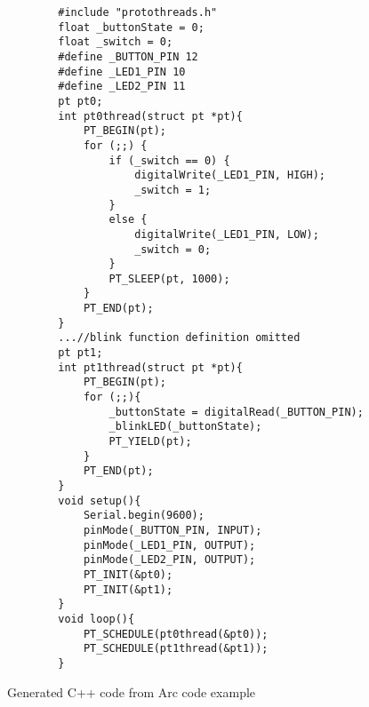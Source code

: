 \begin{listing}[htb!]
    \begin{verbatim}
        #include "protothreads.h"
        float _buttonState = 0;
        float _switch = 0;
        #define _BUTTON_PIN 12
        #define _LED1_PIN 10
        #define _LED2_PIN 11
        pt pt0;
        int pt0thread(struct pt *pt){
            PT_BEGIN(pt);
            for (;;) {
                if (_switch == 0) {
                    digitalWrite(_LED1_PIN, HIGH);
                    _switch = 1;
                }
                else {
                    digitalWrite(_LED1_PIN, LOW);
                    _switch = 0;
                }
                PT_SLEEP(pt, 1000);
            }
            PT_END(pt);
        }
        ...//blink function definition omitted
        pt pt1;
        int pt1thread(struct pt *pt){
            PT_BEGIN(pt);
            for (;;){
                _buttonState = digitalRead(_BUTTON_PIN);
                _blinkLED(_buttonState);
                PT_YIELD(pt);
            }
            PT_END(pt);
        }
        void setup(){
            Serial.begin(9600);
            pinMode(_BUTTON_PIN, INPUT);
            pinMode(_LED1_PIN, OUTPUT);
            pinMode(_LED2_PIN, OUTPUT);
            PT_INIT(&pt0);
            PT_INIT(&pt1);
        }
        void loop(){
            PT_SCHEDULE(pt0thread(&pt0));
            PT_SCHEDULE(pt1thread(&pt1));
        }
    \end{verbatim}
    \caption{Generated C++ code from Arc code example}
    \label{lst:generated C++ code from Arc code example}
\end{listing}
